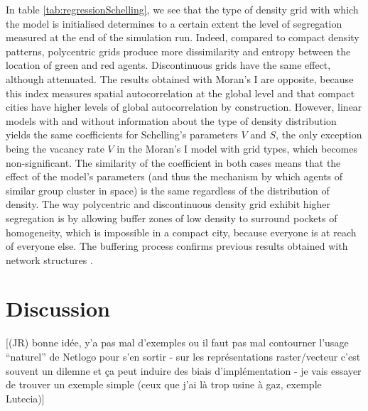 \documentclass[Royal,sageh,times]{sagej}
\begin{document}
In table \ref{tab:regressionSchelling}, we see that the type of density grid with which the model is initialised determines to a certain extent the level of segregation measured at the end of the simulation run. Indeed, compared to compact density patterns, polycentric grids produce more dissimilarity and entropy between the location of green and red agents. Discontinuous grids have the same effect, although attenuated. The results obtained with Moran's I are opposite, because this index measures spatial autocorrelation at the global level and that compact cities have higher levels of global autocorrelation by construction. However, linear models with and without information about the type of density distribution yields the same coefficients for Schelling's parameters $V$ and $S$, the only exception being the vacancy rate $V$ in the Moran's I model with grid types, which becomes non-significant. The similarity of the coefficient in both cases means that the effect of the model's parameters (and thus the mechanism by which agents of similar group cluster in space) is the same regardless of the distribution of density. The way polycentric and discontinuous density grid exhibit higher segregation is by allowing buffer zones of low density to surround pockets of homogeneity, which is impossible in a compact city, because everyone is at reach of everyone else. The buffering process confirms previous results obtained with network structures \citep{Banos2012}.


\section{Discussion}



[(JR) bonne idée, y'a pas mal d'exemples ou il faut pas mal contourner l'usage ``naturel'' de Netlogo pour s'en sortir - sur les représentations raster/vecteur c'est souvent un dilemne et ça peut induire des biais d'implémentation - je vais essayer de trouver un exemple simple (ceux que j'ai là trop usine à gaz, exemple Lutecia)]

\end{document}
